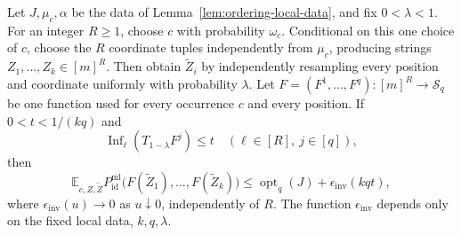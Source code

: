 \begin{lemma}\label{lem:ordering-rounding}
Let \(J,\mu_c,\alpha\) be the data of
Lemma~\ref{lem:ordering-local-data}, and fix \(0<\lambda<1\).
For an integer \(R\ge1\), choose \(c\) with probability \(\omega_c\).
Conditional on this one choice of \(c\), choose the \(R\) coordinate
tuples independently from \(\mu_c\), producing strings
\(Z_1,\ldots,Z_k\in[m]^R\).
Then obtain \(\widetilde Z_i\) by independently resampling every
position and coordinate uniformly with probability \(\lambda\).
Let \(F=(F^1,\ldots,F^q):[m]^R\to\mathcal S_q\) be one function
used for every occurrence \(c\) and every position.  If
\(0<t<1/(kq)\) and
\[
 \operatorname{Inf}_\ell(T_{1-\lambda}F^j)\le t
 \quad(\ell\in[R],\ j\in[q]),
\]
then
\begin{equation}
 \mathbb E_{c,Z,\widetilde Z}
 P_{\mathrm{id}}^{\mathrm{ml}}\bigl(F(\widetilde Z_1),\ldots,
                         F(\widetilde Z_k)\bigr)
 \le \operatorname{opt}_q(J)+\epsilon_{\mathrm{inv}}(kqt),
\label{eq:ordering-rounding}
\end{equation}
where \(\epsilon_{\mathrm{inv}}(u)\to0\) as \(u\downarrow0\), independently of \(R\).
The function \(\epsilon_{\mathrm{inv}}\) depends only on the fixed local data,
\(k,q,\lambda\).
\end{lemma}


